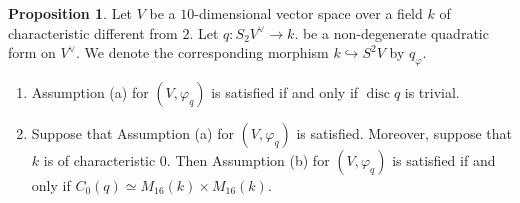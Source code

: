 \documentclass[autodetect-engine, a4paper]{amsart}
\theoremstyle{definition}
\newtheorem{prop}[thm]{Proposition}
\DeclareMathOperator\disc{\mathrm{disc}}
\newcommand{\cred}{\color{black}}
\newcommand{\cora}{\color{black}}
\begin{document}
\begin{prop}
\label{prop:assumptionab}
Let $V$ be a $10$-dimensional vector space over a field $k$ of characteristic different from $2$. 
Let $q \colon S_{2} V^{\vee} \rightarrow k$.
be a {\cred non-degenerate} quadratic form on $V^{\vee}$.
We denote the corresponding morphism $k \hookrightarrow S^2 V$ by $q_\varphi$.
\begin{enumerate}
\item 
Assumption (a) for $(V, \varphi_{q})$ is satisfied if and only if $\disc q $ is trivial.
\item
Suppose that Assumption (a) for $(V, \varphi_{q})$ is satisfied.
{\cora Moreover, suppose that $k$ is of characteristic $0$.}
Then Assumption (b) for $(V, \varphi_{q})$ is satisfied if and only if $C_0 (q) \simeq M_{16} (k) \times M_{16} (k).$
\end{enumerate}
\end{prop}
\end{document}
